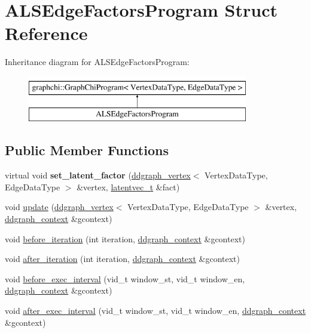\hypertarget{struct_a_l_s_edge_factors_program}{\section{A\-L\-S\-Edge\-Factors\-Program Struct Reference}
\label{struct_a_l_s_edge_factors_program}
}
Inheritance diagram for A\-L\-S\-Edge\-Factors\-Program\-:\begin{figure}[H]
\begin{center}
\leavevmode
\includegraphics[height=2.000000cm]{struct_a_l_s_edge_factors_program}
\end{center}
\end{figure}
\subsection*{Public Member Functions}
\begin{DoxyCompactItemize}
\item 
\hypertarget{struct_a_l_s_edge_factors_program_a71a6c8e94e89219883d740d40aa954f5}{virtual void {\bfseries set\-\_\-latent\-\_\-factor} (\hyperlink{classddgraph_1_1ddgraph__vertex}{ddgraph\-\_\-vertex}$<$ Vertex\-Data\-Type, Edge\-Data\-Type $>$ \&vertex, \hyperlink{structlatentvec__t}{latentvec\-\_\-t} \&fact)}\label{struct_a_l_s_edge_factors_program_a71a6c8e94e89219883d740d40aa954f5}

\item 
void \hyperlink{struct_a_l_s_edge_factors_program_a7d1185171e5172f9f36116399839144a}{update} (\hyperlink{classddgraph_1_1ddgraph__vertex}{ddgraph\-\_\-vertex}$<$ Vertex\-Data\-Type, Edge\-Data\-Type $>$ \&vertex, \hyperlink{structddgraph_1_1ddgraph__context}{ddgraph\-\_\-context} \&gcontext)
\item 
void \hyperlink{struct_a_l_s_edge_factors_program_af42abf2a610775eb04c6d86c380e9af4}{before\-\_\-iteration} (int iteration, \hyperlink{structddgraph_1_1ddgraph__context}{ddgraph\-\_\-context} \&gcontext)
\item 
void \hyperlink{struct_a_l_s_edge_factors_program_a42253a307302cab9a42b44d78cadf57a}{after\-\_\-iteration} (int iteration, \hyperlink{structddgraph_1_1ddgraph__context}{ddgraph\-\_\-context} \&gcontext)
\item 
void \hyperlink{struct_a_l_s_edge_factors_program_a2986001d68d1195e1c3c4e2e52e6d405}{before\-\_\-exec\-\_\-interval} (vid\-\_\-t window\-\_\-st, vid\-\_\-t window\-\_\-en, \hyperlink{structddgraph_1_1ddgraph__context}{ddgraph\-\_\-context} \&gcontext)
\item 
void \hyperlink{struct_a_l_s_edge_factors_program_a20c35d6d2fbb937408f2bba3fe68bf5d}{after\-\_\-exec\-\_\-interval} (vid\-\_\-t window\-\_\-st, vid\-\_\-t window\-\_\-en, \hyperlink{structddgraph_1_1ddgraph__context}{ddgraph\-\_\-context} \&gcontext)
\end{DoxyCompactItemize}
